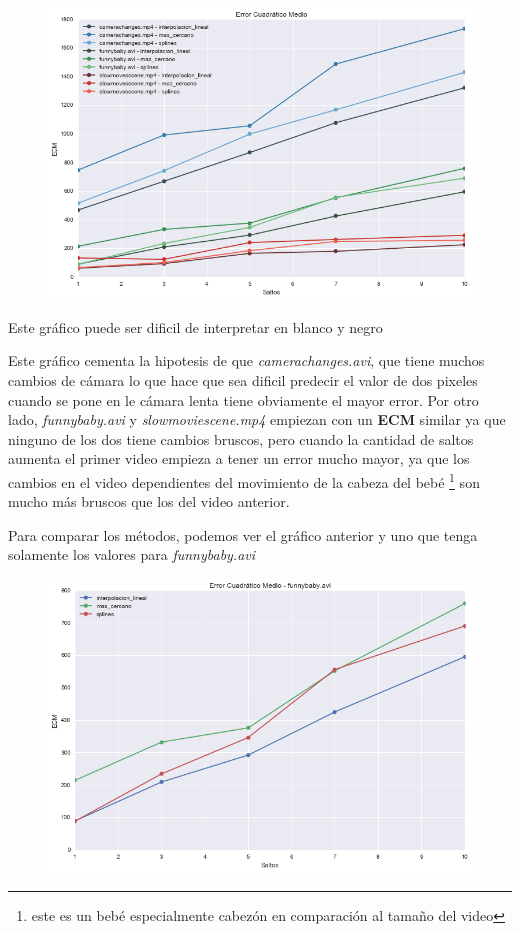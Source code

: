 \begin{figure}[H]
\centering
\includegraphics[width=.95\textwidth]{graficos/ecm.png}
\end{figure}

\vspace{-2em}
\begin{tiny}Este gr\'afico puede ser dificil de interpretar en blanco y negro\end{tiny}
\vspace{2em}

Este gr\'afico cementa la hipotesis de que \textit{camerachanges.avi}, que tiene
muchos cambios de c\'amara lo que hace que sea dificil predecir el valor de dos
pixeles cuando se pone en le c\'amara lenta tiene obviamente el mayor error. Por
otro lado, \textit{funnybaby.avi} y \textit{slowmoviescene.mp4} empiezan con un
\textbf{ECM} similar ya que ninguno de los dos tiene cambios bruscos, pero
cuando la cantidad de saltos aumenta el primer video empieza a tener un error
mucho mayor, ya que los cambios en el video dependientes del movimiento de la
cabeza del beb\'e \footnote{este es un beb\'e especialmente cabez\'on en comparaci\'on al
tama\~no del video} son mucho m\'as bruscos que los del video anterior.

Para comparar los m\'etodos, podemos ver el gr\'afico anterior y uno que tenga
solamente los valores para \textit{funnybaby.avi}

\begin{figure}[H]
\centering
\includegraphics[width=.95\textwidth]{graficos/ecm_funnybaby.png}
\end{figure}

